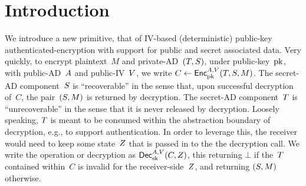 \section{Introduction}
\label{sec:intro}
We introduce a new primitive, that of IV-based (deterministic) public-key authenticated-encryption with support for public and secret associated data.  Very quickly, to encrypt plaintext~$M$ and private-AD~$(T,S)$, under public-key~$\mathrm{pk}$, with public-AD~$A$ and public-IV~$V$, we write $C\gets{\mathsf{Enc}}_{\mathrm{pk}}^{A,V}(T,S,M)$.
The secret-AD component~$S$ is ``recoverable'' in the sense that, upon successful decryption of~$C$, the pair~$(S,M)$ is returned by decryption.  The secret-AD component~$T$ is ``unrecoverable'' in the sense that it is never released by decryption.  Loosely speaking, $T$ is meant to be consumed within the abstraction boundary of decryption, e.g., to support authentication.  In order to leverage this, the receiver would need to keep some state~$Z$ that is passed in to the the decryption call.  We write the operation or decryption as ${\mathsf{Dec}}_{\mathrm{sk}}^{A,V}(C,Z)$, this returning $\bot$ if the~$T$ contained within~$C$ is invalid for the receiver-side~$Z$, and returning $(S,M)$ otherwise.

